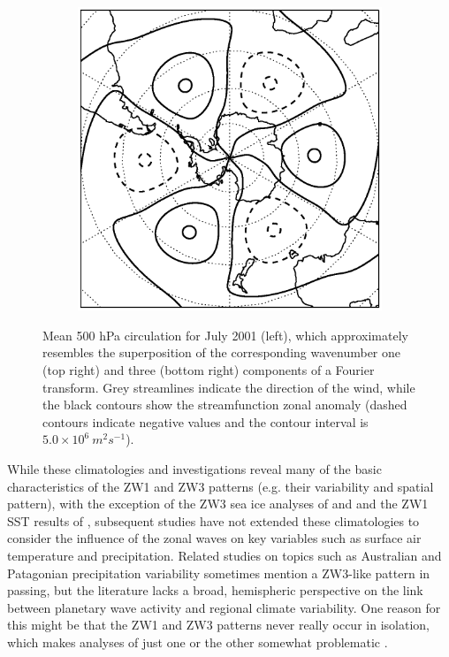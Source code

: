 \begin{figure}
\begin{subfigure}[c]{0.289\textwidth}
\vspace{2ex}

\includegraphics[width=\textwidth]{figures/zonalwaves/Figure1-1c.eps}
\end{subfigure}
\caption[Mean 500 hPa circulation for July 2001 and the corresponding wavenumber one and three components of a Fourier transform]{\label{fig:zw_example}
Mean 500 hPa circulation for July 2001 (left), which approximately resembles the superposition of the corresponding wavenumber one (top right) and three (bottom right) components of a Fourier transform. Grey streamlines indicate the direction of the wind, while the black contours show the streamfunction zonal anomaly (dashed contours indicate negative values and the contour interval is $5.0 \times 10^6 \: m^2 s^{-1}$).%
}
\end{figure}


While these climatologies and investigations reveal many of the basic characteristics of the ZW1 and ZW3 patterns (e.g. their variability and spatial pattern), with the exception of the ZW3 sea ice analyses of \citet{Raphael2007} and \citet{Yuan2008} and the ZW1 SST results of \citet{Hobbs2007}, subsequent studies have not extended these climatologies to consider the influence of the zonal waves on key variables such as surface air temperature and precipitation. Related studies on topics such as Australian \citep{Frederiksen2014} and Patagonian \citep{Garreaud2013} precipitation variability sometimes mention a ZW3-like pattern in passing, but the literature lacks a broad, hemispheric perspective on the link between planetary wave activity and regional climate variability. One reason for this might be that the ZW1 and ZW3 patterns never really occur in isolation, which makes analyses of just one or the other somewhat problematic \citep{Hobbs2010}.

